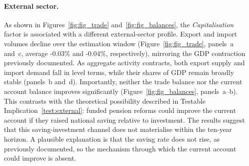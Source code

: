 \documentclass[11pt,english,a4paper, twoside, authoryear]{article}
\begin{document}
\paragraph{External sector.}
As shown in Figures~\ref{fig:fig_trade} and~\ref{fig:fig_balances}, the \textit{Capitalisation}  factor is associated with a different external-sector profile. Export and import volumes decline over the estimation window (Figure~\ref{fig:fig_trade}, panels~a and~c, average -0.03\% and -0.04\%, respectively), mirroring the GDP contraction previously documented. As aggregate activity contracts, both export supply and import demand fall in level terms, while their shares of GDP remain broadly stable (panels~b and~d). Importantly, neither the trade balance nor the current account balance improves significantly (Figure~\ref{fig:fig_balances}, panels~a--b). This contrasts with the theoretical possibility described in Testable Implication~\ref{test:external}: funded pension reforms could improve the current account if they raised national saving relative to investment. The results suggest that this saving-investment channel does not materialise within the ten-year horizon. A plausible explanation is that the saving rate does not rise, as previously documented, so the mechanism through which the current account could improve is absent.\\
\end{document}
